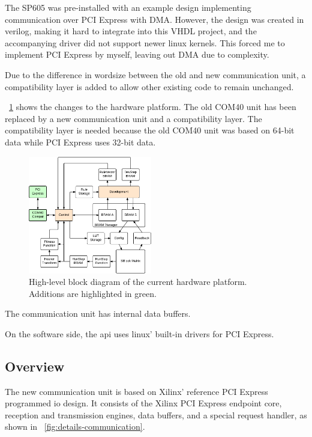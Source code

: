 The SP605 was pre-installed with an example design implementing communication over PCI Express with DMA.
However, the design was created in verilog, making it hard to integrate into this VHDL project, and the accompanying driver did not support newer linux kernels.
This forced me to implement PCI Express by myself, leaving out DMA due to complexity.

Due to the difference in wordsize between the old and new communication unit, a compatibility layer is added to allow other existing code to remain unchanged.

\figurename~\ref{fig:overview-lundal} shows the changes to the hardware platform.
The old COM40 unit has been replaced by a new communication unit and a compatibility layer.
The compatibility layer is needed because the old COM40 unit was based on 64-bit data while PCI Express uses 32-bit data.

\begin{figure}[!ht]
    \centering
    \includegraphics[width=0.48\textwidth]{figures/overview-lundal}
    \caption{High-level block diagram of the current hardware platform. Additions are highlighted in green.}
    \label{fig:overview-lundal}
\end{figure}

The communication unit has internal data buffers.

On the software side, the api uses linux' built-in drivers for PCI Express.

\subsection{Overview}

The new communication unit is based on Xilinx' reference PCI Express programmed io design.
It consists of the Xilinx PCI Express endpoint core, reception and transmission engines, data buffers, and a special request handler, as shown in \figurename~\ref{fig:details-communication}.

